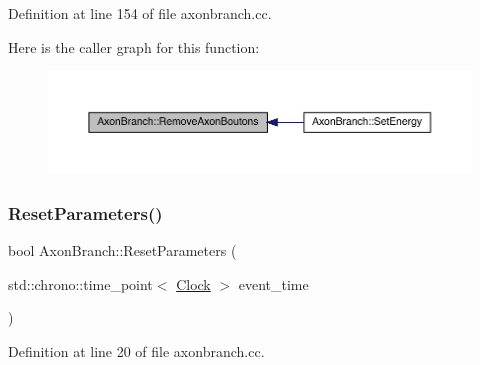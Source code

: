 Definition at line 154 of file axonbranch.\+cc.

Here is the caller graph for this function\+:
\nopagebreak
\begin{figure}[H]
\begin{center}
\leavevmode
\includegraphics[width=350pt]{class_axon_branch_a815e055e37f89fb2627b250c5b95d406_icgraph}
\end{center}
\end{figure}
\mbox{\label{class_axon_branch_a195d68dffd37317db3f94e1b4c8f73c7}} 
\subsubsection{\texorpdfstring{Reset\+Parameters()}{ResetParameters()}}
{\footnotesize\ttfamily bool Axon\+Branch\+::\+Reset\+Parameters (\begin{DoxyParamCaption}\item[{std\+::chrono\+::time\+\_\+point$<$ \hyperlink{universe_8h_a0ef8d951d1ca5ab3cfaf7ab4c7a6fd80}{Clock} $>$}]{event\+\_\+time }\end{DoxyParamCaption})}



Definition at line 20 of file axonbranch.\+cc.

